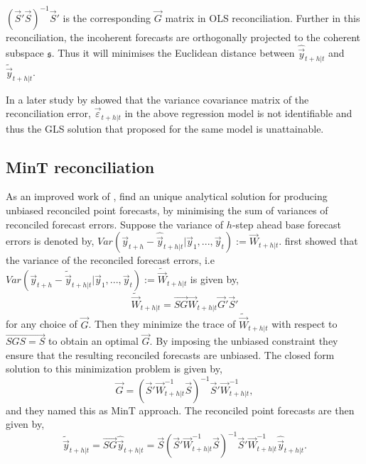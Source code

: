 \documentclass[graybox]{svmult}
\begin{document}
$(\vec{S}'\vec{S})^{-1}\vec{S}'$ is the corresponding $\vec{G}$ matrix in OLS reconciliation. Further in this reconciliation, the incoherent forecasts are orthogonally projected to the coherent subspace $\mathfrak{s}$. Thus it will minimises the Euclidean distance between $\hat{\vec{y}}_{t+h|t}$ and $\tilde{\vec{y}}_{t+h|t}$. 

In a later study by \cite{Wickramasuriya2018} showed that the variance covariance matrix of the reconciliation error, $\vec{\varepsilon}_{t+h|t}$ in the above regression model is not identifiable and thus the GLS solution that \cite{hyndman2011} proposed for the same model is unattainable. 


\subsection{MinT reconciliation}

As an improved work of \cite{hyndman2011}, \cite{Wickramasuriya2018} find an unique analytical solution for producing unbiased reconciled point forecasts, by minimising the sum of variances of reconciled forecast errors. Suppose the variance of $h$-step ahead base forecast errors is denoted by, $Var(\vec{y}_{t+h} - \hat{\vec{y}}_{t+h|t}|\vec{y}_1,...,\vec{y}_t) := \vec{W}_{t+h|t}$. \cite{Wickramasuriya2018} first showed that the variance of the reconciled forecast errors, i.e $Var(\vec{y}_{t+h} - \tilde{\vec{y}}_{t+h|t}|\vec{y}_1,...,\vec{y}_t) := \tilde{\vec{W}}_{t+h|t}$ is given by,
\begin{equation} \label{eq:12}
\tilde{\vec{W}}_{t+h|t} = \vec{SG}\vec{W}_{t+h|t} \vec{G}'\vec{S}'
\end{equation}
for any choice of $\vec{G}$. Then they minimize the trace of $\tilde{\vec{W}}_{t+h|t}$ with respect to $\vec{SGS=S}$ to obtain an optimal $\vec{G}$. By imposing the unbiased constraint they ensure that the resulting reconciled forecasts are unbiased. The closed form solution to this minimization problem is given by,
\begin{equation} \label{eq:13}
\vec{G} = (\vec{S}'{\vec{W}}^{-1}_{t+h|t}\vec{S})^{-1}\vec{S}'{\vec{W}}^{-1}_{t+h|t},
\end{equation}
and they named this as MinT approach. The reconciled point forecasts are then given by,
\begin{equation} \label{eq:14}
\tilde{\vec{y}}_{t+h|t} = \vec{SG}\hat{\vec{y}}_{t+h|t} = \vec{S}(\vec{S}'{\vec{W}}_{t+h|t}^{-1}\vec{S})^{-1}\vec{S}'{\vec{W}}_{t+h|t}^{-1}\hat{\vec{y}}_{t+h|t}.
\end{equation}\\
\end{document}
